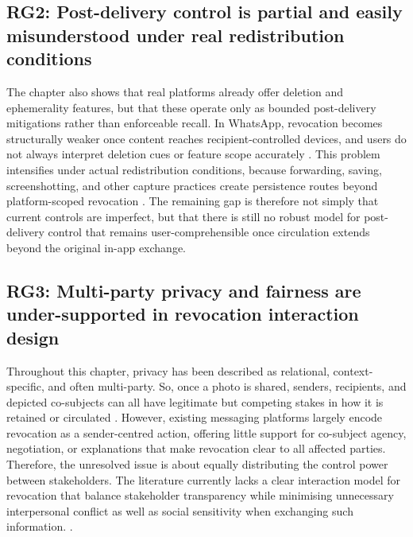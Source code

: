 \subsection{RG2: Post-delivery control is partial and easily misunderstood under real redistribution conditions}
The chapter also shows that real platforms already offer deletion and ephemerality features, but that these operate only as bounded post-delivery mitigations rather than enforceable recall. In WhatsApp, revocation becomes structurally weaker once content reaches recipient-controlled devices, and users do not always interpret deletion cues or feature scope accurately \cite{politou_2018,schnitzler_2020,whatsapp_delete_messages,whatsapp_disappearing_messages,whatsapp_view_once}. This problem intensifies under actual redistribution conditions, because forwarding, saving, screenshotting, and other capture practices create persistence routes beyond platform-scoped revocation \cite{heath_2023,ingber_2025}. The remaining gap is therefore not simply that current controls are imperfect, but that there is still no robust model for post-delivery control that remains user-comprehensible once circulation extends beyond the original in-app exchange.

\subsection{RG3: Multi-party privacy and fairness are under-supported in revocation interaction design}
Throughout this chapter, privacy has been described as relational, context-specific, and often multi-party. So, once a photo is shared, senders, recipients, and depicted co-subjects can all have legitimate but competing stakes in how it is retained or circulated \cite{petronio_cpm_2020,nissenbaum_contextual_2011,cherubini_2021}. However, existing messaging platforms largely encode revocation as a sender-centred action, offering little support for co-subject agency, negotiation, or explanations that make revocation clear to all affected parties. Therefore, the unresolved issue is about equally distributing the control power between stakeholders. The literature currently lacks a clear interaction model for revocation that balance stakeholder transparency while minimising unnecessary interpersonal conflict as well as social sensitivity when exchanging such information.  \cite{cherubini_2021,ingber_2025}.

